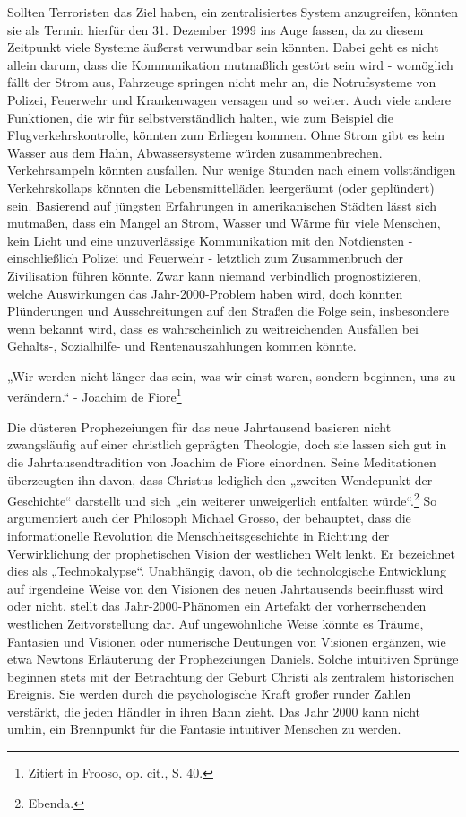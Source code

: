 \documentclass[
  a5paper,
  smalldemyvopaper,10pt,twoside,onecolumn,openright,extrafontsizes,hidelinks]{memoir}
\renewenvironment{quote}%
               {\list{}{\rightmargin=.6cm\leftmargin=.6cm}%
                \itshape \item[]}%
               {\endlist}
\begin{document}
Sollten Terroristen das Ziel haben, ein zentralisiertes System
anzugreifen, könnten sie als Termin hierfür den 31. Dezember 1999 ins
Auge fassen, da zu diesem Zeitpunkt viele Systeme äußerst verwundbar
sein könnten. Dabei geht es nicht allein darum, dass die Kommunikation
mutmaßlich gestört sein wird - womöglich fällt der Strom aus, Fahrzeuge
springen nicht mehr an, die Notrufsysteme von Polizei, Feuerwehr und
Krankenwagen versagen und so weiter. Auch viele andere Funktionen, die
wir für selbstverständlich halten, wie zum Beispiel die
Flugverkehrskontrolle, könnten zum Erliegen kommen. Ohne Strom gibt es
kein Wasser aus dem Hahn, Abwassersysteme würden zusammenbrechen.
Verkehrsampeln könnten ausfallen. Nur wenige Stunden nach einem
vollständigen Verkehrskollaps könnten die Lebensmittelläden leergeräumt
(oder geplündert) sein. Basierend auf jüngsten Erfahrungen in
amerikanischen Städten lässt sich mutmaßen, dass ein Mangel an Strom,
Wasser und Wärme für viele Menschen, kein Licht und eine unzuverlässige
Kommunikation mit den Notdiensten - einschließlich Polizei und Feuerwehr
- letztlich zum Zusammenbruch der Zivilisation führen könnte. Zwar kann
niemand verbindlich prognostizieren, welche Auswirkungen das
Jahr-2000-Problem haben wird, doch könnten Plünderungen und
Ausschreitungen auf den Straßen die Folge sein, insbesondere wenn
bekannt wird, dass es wahrscheinlich zu weitreichenden Ausfällen bei
Gehalts-, Sozialhilfe- und Rentenauszahlungen kommen könnte.

\begin{quote}
„Wir werden nicht länger das sein, was wir einst waren, sondern
beginnen, uns zu verändern.`` - Joachim de Fiore\footnote{Zitiert in
  Frooso, op. cit., S. 40.}
\end{quote}

Die düsteren Prophezeiungen für das neue Jahrtausend basieren nicht
zwangsläufig auf einer christlich geprägten Theologie, doch sie lassen
sich gut in die Jahrtausendtradition von Joachim de Fiore einordnen.
Seine Meditationen überzeugten ihn davon, dass Christus lediglich den
„zweiten Wendepunkt der Geschichte`` darstellt und sich „ein weiterer
unweigerlich entfalten würde``.\footnote{Ebenda.} So argumentiert auch
der Philosoph Michael Grosso, der behauptet, dass die informationelle
Revolution die Menschheitsgeschichte in Richtung der Verwirklichung der
prophetischen Vision der westlichen Welt lenkt. Er bezeichnet dies als
„Technokalypse``. Unabhängig davon, ob die technologische Entwicklung
auf irgendeine Weise von den Visionen des neuen Jahrtausends beeinflusst
wird oder nicht, stellt das Jahr-2000-Phänomen ein Artefakt der
vorherrschenden westlichen Zeitvorstellung dar. Auf ungewöhnliche Weise
könnte es Träume, Fantasien und Visionen oder numerische Deutungen von
Visionen ergänzen, wie etwa Newtons Erläuterung der Prophezeiungen
Daniels. Solche intuitiven Sprünge beginnen stets mit der Betrachtung
der Geburt Christi als zentralem historischen Ereignis. Sie werden durch
die psychologische Kraft großer runder Zahlen verstärkt, die jeden
Händler in ihren Bann zieht. Das Jahr 2000 kann nicht umhin, ein
Brennpunkt für die Fantasie intuitiver Menschen zu werden.
\end{document}
